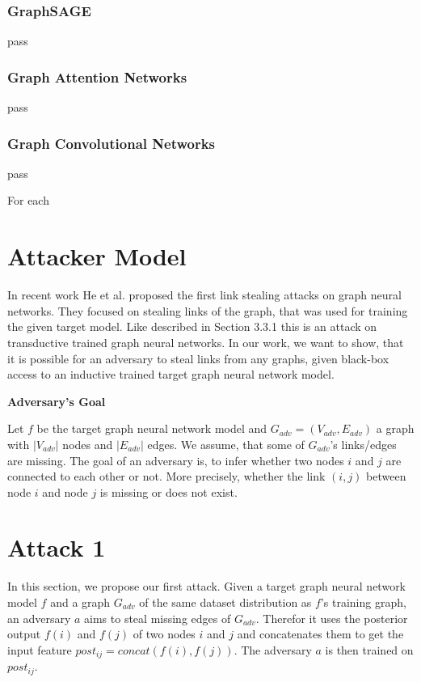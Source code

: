       \subsubsection{GraphSAGE}
        pass

      \subsubsection{Graph Attention Networks}
        pass

      \subsubsection{Graph Convolutional Networks}
        pass

    For each   


  \section{Attacker Model}


  \newpage

  In recent work He et al. \cite{DBLP:journals/corr/abs-2005-02131} proposed the first link stealing attacks on graph neural networks.
  They focused on stealing links of the graph, that was used for training the given target model.
  Like described in Section 3.3.1 this is an attack on transductive trained graph neural networks.
  In our work, we want to show, that it is possible for an adversary to steal links from any graphs, given black-box access to an inductive trained target graph neural network model.

  \textbf{Adversary's Goal}

  Let $f$ be the target graph neural network model and $G_{adv} = (V_{adv}, E_{adv})$ a graph with $|V_{adv}|$ nodes and $|E_{adv}|$ edges. 
  We assume, that some of $G_{adv}$'s links/edges are missing.
  The goal of an adversary is, to infer whether two nodes $i$ and $j$ are connected to each other or not.
  More precisely, whether the link $(i,j)$ between node $i$ and node $j$ is missing or does not exist.
  

  \section{Attack 1}

    In this section, we propose our first attack. 
    Given a target graph neural network model $f$ and a graph $G_{adv}$ of the same dataset distribution as $f$'s training graph, an adversary $a$ aims to steal missing edges of $G_{adv}$.
    Therefor it uses the posterior output $f(i)$ and $f(j)$ of two nodes $i$ and $j$ and concatenates them to get the input feature $post_{ij} = concat(f(i),f(j))$. The adversary $a$ is then trained on $post_{ij}$.

